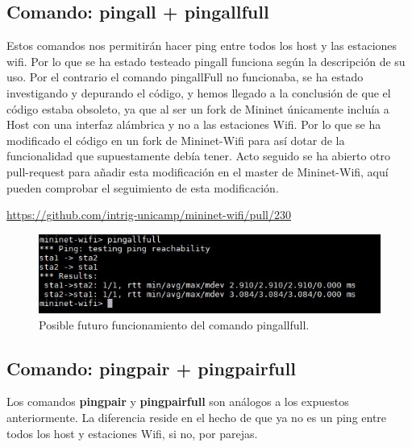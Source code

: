 \subsection{Comando: pingall + pingallfull}
Estos comandos nos permitirán hacer ping entre todos los host y las estaciones wifi. Por lo que se ha estado testeado pingall funciona según la descripción de su uso. Por el contrario el comando pingallFull no funcionaba, se ha estado investigando y depurando el código, y hemos llegado a la conclusión de que el código estaba obsoleto, ya que al ser un fork de Mininet únicamente incluía a Host con una interfaz alámbrica y no a las estaciones Wifi. Por lo que se ha modificado el código en un fork de Mininet-Wifi para así dotar de la funcionalidad que supuestamente debía tener. Acto seguido se ha abierto otro pull-request para añadir esta modificación en el master de Mininet-Wifi, aquí pueden comprobar el seguimiento de esta modificación.\newline
\newline
\begin{center}
    \url{https://github.com/intrig-unicamp/mininet-wifi/pull/230}
\end{center}
\newpage
\begin{figure}[!htb]
  \centering
    \includegraphics[width=0.7\linewidth]{./img/cli/pullrequest_2.JPG}
    \caption{Posible futuro funcionamiento del comando pingallfull.}
  \label{fig:yo}
\end{figure}
\subsection{Comando: pingpair + pingpairfull}
Los comandos \textbf{pingpair} y \textbf{pingpairfull} son análogos a los expuestos anteriormente. La diferencia reside en el hecho de que ya no es un ping entre todos los host y estaciones Wifi, si no, por parejas. 

